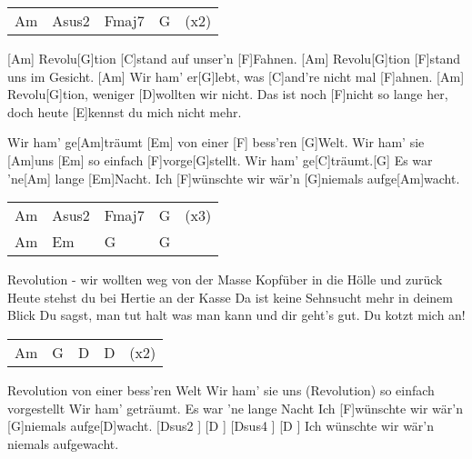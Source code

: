 
\hspace*{\fill}{\footnotesize(Capo 3. Bund)}

\begin{guitar}
 	{\footnotesize\begin{tabular}{l|l|l|l|l}
 		Am & Asus2 & Fmaj7 & G & (x2)
 	\end{tabular}}
	
	[Am] Revolu[G]tion [C]stand auf unser'n [F]Fahnen.
	[Am] Revolu[G]tion [F]stand uns im Gesicht.
	[Am] Wir ham' er[G]lebt, was [C]and're nicht mal [F]ahnen.
	[Am] Revolu[G]tion, weniger [D]wollten wir nicht.
	Das ist noch [F]nicht so lange her, doch heute [E]kennst du mich nicht mehr.
	
	Wir ham' ge[Am]träumt [Em] von einer [F] bess'ren [G]Welt.
	Wir ham' sie [Am]uns [Em] so einfach [F]vorge[G]stellt.
	Wir ham' ge[C]träumt.[G] Es war 'ne[Am] lange [Em]Nacht.
	Ich [F]wünschte wir wär'n [G]niemals aufge[Am]wacht.
	
	{\footnotesize\begin{tabular}{l|l|l|l|l}
		Am & Asus2 & Fmaj7 & G & (x3) \\
		Am & Em & G & G & 
	\end{tabular}}

	Revolution - wir wollten weg von der Masse
	Kopfüber in die Hölle und zurück
	Heute stehst du bei Hertie an der Kasse
	Da ist keine Sehnsucht mehr in deinem Blick
	Du sagst, man tut halt was man kann und dir geht's gut. Du kotzt mich an!
	
	 
		
	{\footnotesize\begin{tabular}{l|l|l|l|l}
		Am	& G	& D	& D	& (x2)
	\end{tabular}}
	
	\pagebreak
	
	Revolution von einer bess'ren Welt
	Wir ham' sie uns (Revolution) so einfach vorgestellt
	Wir ham' geträumt. Es war 'ne lange Nacht
	Ich	[F]wünschte wir wär'n [G]niemals aufge[D]wacht. [Dsus2 ] [D ] [Dsus4 ] [D ]{} 
	Ich wünschte wir wär'n niemals aufgewacht.
	
\end{guitar}